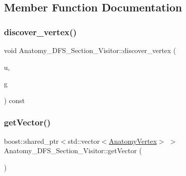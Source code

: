 \subsection{Member Function Documentation}
\mbox{\label{class_anatomy___d_f_s___section___visitor_a97c0f08ebe41676b1effa6cd89c463cb}} 
\subsubsection{\texorpdfstring{discover\+\_\+vertex()}{discover\_vertex()}}
{\footnotesize\ttfamily void Anatomy\+\_\+\+D\+F\+S\+\_\+\+Section\+\_\+\+Visitor\+::discover\+\_\+vertex (\begin{DoxyParamCaption}\item[{\mbox{\hyperlink{_body_graph_8hpp_aeb92fc7b3eed88cf25a4fc7b708a66cf}{Anatomy\+Vertex}}}]{u,  }\item[{const \mbox{\hyperlink{_body_graph_8hpp_ab01b157c2e143191570b012d275fbf0d}{Anatomy\+Graph}} \&}]{g }\end{DoxyParamCaption}) const\hspace{0.3cm}{\ttfamily [inline]}}

\mbox{\label{class_anatomy___d_f_s___section___visitor_afc33d9738683a4e662545181ee596350}} 
\subsubsection{\texorpdfstring{get\+Vector()}{getVector()}}
{\footnotesize\ttfamily boost\+::shared\+\_\+ptr$<$std\+::vector$<$\mbox{\hyperlink{_body_graph_8hpp_aeb92fc7b3eed88cf25a4fc7b708a66cf}{Anatomy\+Vertex}}$>$ $>$ Anatomy\+\_\+\+D\+F\+S\+\_\+\+Section\+\_\+\+Visitor\+::get\+Vector (\begin{DoxyParamCaption}{ }\end{DoxyParamCaption})\hspace{0.3cm}{\ttfamily [inline]}}

